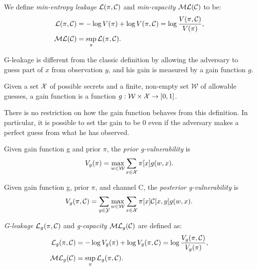 \begin{definition}
	We define \textit{min-entropy leakage} $\mathcal{L}(\pi, \mathcal{C})$ and \textit{min-capacity} $\mathcal{ML}(\mathcal{C})$ to be:
	\begin{align}
	\mathcal{L}(\pi, \mathcal{C}) &= - \log V(\pi) + \log V(\pi, \mathcal{C}) = \log \frac{V(\pi, \mathcal{C})}{V(\pi)}, \\
	\mathcal{ML}(\mathcal{C}) &= \sup_{\pi} \mathcal{L}(\pi, \mathcal{C}).  
	\end{align}
\end{definition}


G-leakage is different from the classic definition by allowing the adversary to guess part of $x$ from observation $y$, and his gain is measured by a gain function $g$.


\begin{definition}
	Given a set $\mathcal{X}$ of possible secrets and a finite, non-empty set $\mathcal{W}$ of allowable guesses, a gain function is a function $g: \mathcal{W} \times \mathcal{X} \rightarrow [0,1]$.
\end{definition}

There is no restriction on how the gain function behaves from this definition. In particular, it is possible to set the gain to be 0 even if the adversary makes a perfect guess from what he has observed.


\begin{definition}
	Given gain function g and prior $\pi$, the \textit{prior g-vulnerability} is
	\begin{equation}
	V_{g}(\pi)=\max_{w\in {\cal W}}\displaystyle\sum_{x\in {\cal X}}\pi[x]g(w, x).
	\end{equation}
\end{definition}


\begin{definition}
	Given gain function g, prior $\pi$, and channel C, the \textit{posterior g-vulnerability} is
	\begin{equation}
	V_{g}(\pi, \mathcal{C}) = \sum_{y \in {\mathcal{Y}}} \max_{w \in {\mathcal{W}}} \sum_{x \in {\mathcal{X}}} \pi [x] \mathcal{C}[x, y] g(w, x).
	\end{equation}
\end{definition}


\begin{definition}
	\textit{G-leakage} $\mathcal{L}_{g} (\pi, \mathcal{C})$ and \textit{g-capacity} $\mathcal{ML}_{g} (\mathcal{C})$ are defined as:
	\begin{align*}
	\mathcal{L}_{g} (\pi, \mathcal{C}) & = - \log V_{g}(\pi) + \log V_{g}(\pi, \mathcal{C}) = \log \frac{V_{g}(\pi, \mathcal{C})}{V_{g}(\pi)}, \\
	\mathcal{ML}_{g}(\mathcal{C}) &= \sup_{\pi} \mathcal{L}_{g}(\pi, \mathcal{C}). 
	\end{align*} 
\end{definition}


